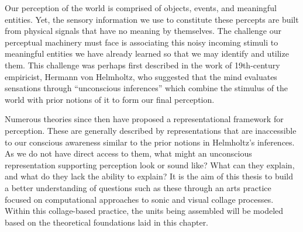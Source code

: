 \documentclass[a4paper,11pt,final]{ThesisStyle}
\begin{document}






Our perception of the world is comprised of objects, events, and meaningful entities.  Yet, the sensory information we use to constitute these percepts are built from physical signals that have no meaning by themselves.  The challenge our perceptual machinery must face is associating this noisy incoming stimuli to meaningful entities we have already learned so that we may identify and utilize them.  This challenge was perhaps first described in the work of 19th-century empiricist, Hermann von Helmholtz, who suggested that the mind evaluates sensations through ``unconscious inferences'' which combine the stimulus of the world with prior notions of it to form our final perception. 

Numerous theories since then have proposed a representational framework for perception.  These are generally described by representations that are inaccessible to our conscious awareness similar to the prior notions in Helmholtz's inferences.  As we do not have direct access to them, what might an unconscious representation supporting perception look or sound like?  What can they explain, and what do they lack the ability to explain?  It is the aim of this thesis to build a better understanding of questions such as these through an arts practice focused on computational approaches to sonic and visual collage processes.  Within this collage-based practice, the units being assembled will be modeled based on the theoretical foundations laid in this chapter.  
\end{document}
